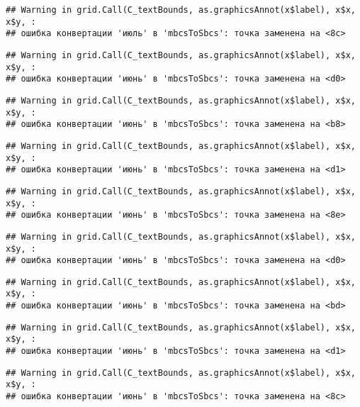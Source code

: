 \documentclass[
]{article}
\begin{document}
\begin{verbatim}
## Warning in grid.Call(C_textBounds, as.graphicsAnnot(x$label), x$x, x$y, :
## ошибка конвертации 'июль' в 'mbcsToSbcs': точка заменена на <8c>
\end{verbatim}

\begin{verbatim}
## Warning in grid.Call(C_textBounds, as.graphicsAnnot(x$label), x$x, x$y, :
## ошибка конвертации 'июнь' в 'mbcsToSbcs': точка заменена на <d0>
\end{verbatim}

\begin{verbatim}
## Warning in grid.Call(C_textBounds, as.graphicsAnnot(x$label), x$x, x$y, :
## ошибка конвертации 'июнь' в 'mbcsToSbcs': точка заменена на <b8>
\end{verbatim}

\begin{verbatim}
## Warning in grid.Call(C_textBounds, as.graphicsAnnot(x$label), x$x, x$y, :
## ошибка конвертации 'июнь' в 'mbcsToSbcs': точка заменена на <d1>
\end{verbatim}

\begin{verbatim}
## Warning in grid.Call(C_textBounds, as.graphicsAnnot(x$label), x$x, x$y, :
## ошибка конвертации 'июнь' в 'mbcsToSbcs': точка заменена на <8e>
\end{verbatim}

\begin{verbatim}
## Warning in grid.Call(C_textBounds, as.graphicsAnnot(x$label), x$x, x$y, :
## ошибка конвертации 'июнь' в 'mbcsToSbcs': точка заменена на <d0>
\end{verbatim}

\begin{verbatim}
## Warning in grid.Call(C_textBounds, as.graphicsAnnot(x$label), x$x, x$y, :
## ошибка конвертации 'июнь' в 'mbcsToSbcs': точка заменена на <bd>
\end{verbatim}

\begin{verbatim}
## Warning in grid.Call(C_textBounds, as.graphicsAnnot(x$label), x$x, x$y, :
## ошибка конвертации 'июнь' в 'mbcsToSbcs': точка заменена на <d1>
\end{verbatim}

\begin{verbatim}
## Warning in grid.Call(C_textBounds, as.graphicsAnnot(x$label), x$x, x$y, :
## ошибка конвертации 'июнь' в 'mbcsToSbcs': точка заменена на <8c>
\end{verbatim}
\end{document}
